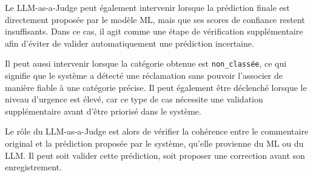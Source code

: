 \documentclass[12pt,a4paper,oneside]{report}
\begin{document}
\begin{itemize}
\begin{enumerate}
Le LLM-as-a-Judge peut également intervenir lorsque la prédiction finale est directement proposée par le modèle ML, mais que ses scores de confiance restent insuffisants. Dans ce cas, il agit comme une étape de vérification supplémentaire afin d’éviter de valider automatiquement une prédiction incertaine.

Il peut aussi intervenir lorsque la catégorie obtenue est \texttt{non\_classée}, ce qui signifie que le système a détecté une réclamation sans pouvoir l’associer de manière fiable à une catégorie précise. Il peut également être déclenché lorsque le niveau d’urgence est élevé, car ce type de cas nécessite une validation supplémentaire avant d’être priorisé dans le système.

Le rôle du LLM-as-a-Judge est alors de vérifier la cohérence entre le commentaire original et la prédiction proposée par le système, qu’elle provienne du ML ou du LLM. Il peut soit valider cette prédiction, soit proposer une correction avant son enregistrement.

\end{enumerate}
\end{itemize}

\clearpage
\end{document}
